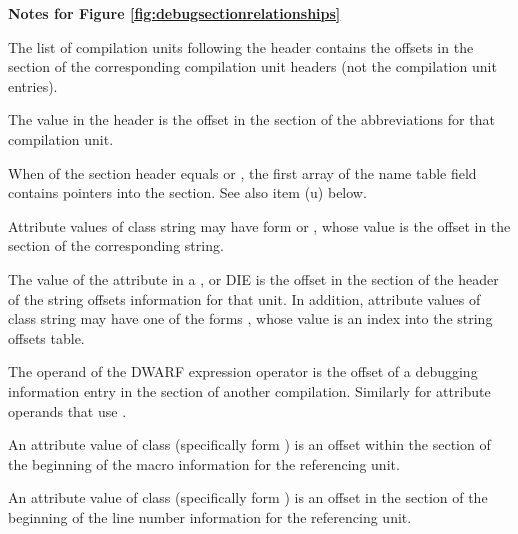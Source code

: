\clearpage
\begin{center}
   \textbf{Notes for Figure \ref{fig:debugsectionrelationships}}
\end{center}
\begin{description}

%
\bb
{}
\eb
The list of compilation units following the header
contains the offsets in the
\dotdebuginfo{} section of the
corresponding compilation unit headers (not
the compilation unit entries).

%
\bb
{}
\eb
The \HFNdebugabbrevoffset{} value in the header is the offset in the
\dotdebugabbrev{}
section of the abbreviations for that compilation unit.

\bb
{}
When \HFNstrformat{} of the section header equals \DWFORMstrp{}
or \DWFORMstrpeight{}, the first array of the name table
field contains pointers into the \dotdebugstr{} section.
See also item (u) below.
\eb

Attribute values of class string may have form \DWFORMstrp{}
\bb
or \DWFORMstrpeight{},
\eb
whose value is the offset in the \dotdebugstr{}
section of the corresponding string.

The value of the
\bb
\DWATstroffsets{}
\eb
attribute in a
\DWTAGcompileunit{}, \DWTAGtypeunit{} or \DWTAGpartialunit{}
DIE is the offset in the
\dotdebugstroffsets{} section of the
\bb
header of the string offsets information
\eb
{}
for that unit.
In addition, attribute values of class string may have
one of the forms
\DWFORMstrxXNor, whose value is an index into the
string offsets table.

The operand of the \DWOPcallref{}
DWARF expression operator is the
offset of a debugging information entry in the
\dotdebuginfo{} section of another compilation.
Similarly for attribute operands that use
\DWFORMrefaddr.

An attribute value of class
 (specifically form
\DWFORMsecoffset) is an
offset within the
\dotdebugmacro{} section
of the beginning of the macro information for the referencing unit.

An attribute value of class
 (specifically form
\DWFORMsecoffset)
is an offset in the
\dotdebugline{} section of the
beginning of the line number information for the referencing unit.


\end{description}

